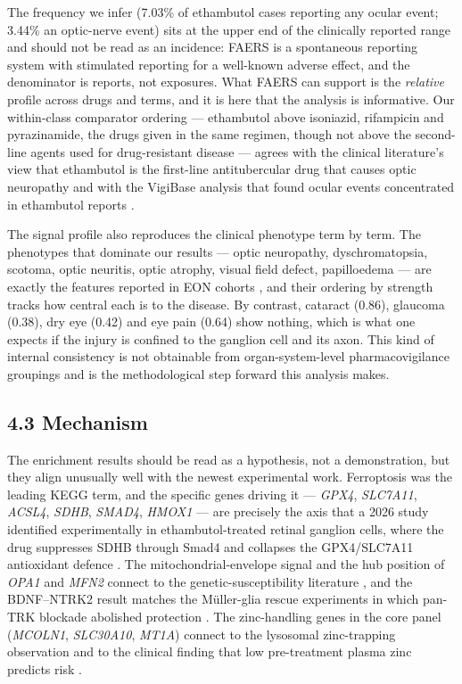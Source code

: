 \documentclass[utf8]{FrontiersinVancouver}
\begin{document}
The frequency we infer (7.03\% of ethambutol cases reporting any ocular event; 3.44\% an optic-nerve event) sits at the upper end of the clinically reported range and should not be read as an incidence: FAERS is a spontaneous reporting system with stimulated reporting for a well-known adverse effect, and the denominator is reports, not exposures. What FAERS can support is the \textit{relative} profile across drugs and terms, and it is here that the analysis is informative. Our within-class comparator ordering --- ethambutol above isoniazid, rifampicin and pyrazinamide, the drugs given in the same regimen, though not above the second-line agents used for drug-resistant disease --- agrees with the clinical literature's view that ethambutol is the first-line antitubercular drug that causes optic neuropathy \citep{pr2006} and with the VigiBase analysis that found ocular events concentrated in ethambutol reports \citep{j2026}.

The signal profile also reproduces the clinical phenotype term by term. The phenotypes that dominate our results --- optic neuropathy, dyschromatopsia, scotoma, optic neuritis, optic atrophy, visual field defect, papilloedema --- are exactly the features reported in EON cohorts \citep{s2022,g2026,ke2025,j2025}, and their ordering by strength tracks how central each is to the disease. By contrast, cataract (0.86), glaucoma (0.38), dry eye (0.42) and eye pain (0.64) show nothing, which is what one expects if the injury is confined to the ganglion cell and its axon. This kind of internal consistency is not obtainable from organ-system-level pharmacovigilance groupings and is the methodological step forward this analysis makes.

\subsection{4.3 Mechanism}

The enrichment results should be read as a hypothesis, not a demonstration, but they align unusually well with the newest experimental work. Ferroptosis was the leading KEGG term, and the specific genes driving it --- \textit{GPX4}, \textit{SLC7A11}, \textit{ACSL4}, \textit{SDHB}, \textit{SMAD4}, \textit{HMOX1} --- are precisely the axis that a 2026 study identified experimentally in ethambutol-treated retinal ganglion cells, where the drug suppresses SDHB through Smad4 and collapses the GPX4/SLC7A11 antioxidant defence \citep{q2026}. The mitochondrial-envelope signal and the hub position of \textit{OPA1} and \textit{MFN2} connect to the genetic-susceptibility literature \citep{xh2021}, and the BDNF--NTRK2 result matches the Müller-glia rescue experiments in which pan-TRK blockade abolished protection \citep{hc2025}. The zinc-handling genes in the core panel (\textit{MCOLN1}, \textit{SLC30A10}, \textit{MT1A}) connect to the lysosomal zinc-trapping observation \citep{h2009} and to the clinical finding that low pre-treatment plasma zinc predicts risk \citep{e1978}.
\end{document}
